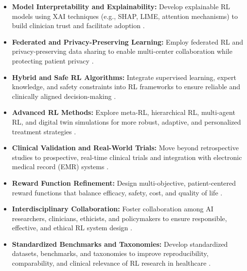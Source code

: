 \documentclass[runningheads]{llncs}
\begin{document}
\begin{itemize}
    \item \textbf{Model Interpretability and Explainability:} Develop explainable RL models using XAI techniques (e.g., SHAP, LIME, attention mechanisms) to build clinician trust and facilitate adoption \cite{banumathiReinforcementLearningPersonalized2025a, maDeepAttentionQnetwork2023, gorrepatiReinforcementLearningFramework2025, frommeyerReinforcementLearningIts2025}.
    \item \textbf{Federated and Privacy-Preserving Learning:} Employ federated RL and privacy-preserving data sharing to enable multi-center collaboration while protecting patient privacy \cite{banumathiReinforcementLearningPersonalized2025a, abdellatifReinforcementLearningIntelligent2021}.
    \item \textbf{Hybrid and Safe RL Algorithms:} Integrate supervised learning, expert knowledge, and safety constraints into RL frameworks to ensure reliable and clinically aligned decision-making \cite{wuValuebasedDeepReinforcement2023, yuSupervisedactorcriticReinforcementLearning2020, zhaoSafeenhancedFullyClosedloop2025, gorrepatiReinforcementLearningFramework2025}.
    \item \textbf{Advanced RL Methods:} Explore meta-RL, hierarchical RL, multi-agent RL, and digital twin simulations for more robust, adaptive, and personalized treatment strategies \cite{banumathiReinforcementLearningPersonalized2025a, decarloReinforcementLearningPKPD2024, gorrepatiReinforcementLearningFramework2025, petersenDeepReinforcementLearning2019}.
    \item \textbf{Clinical Validation and Real-World Trials:} Move beyond retrospective studies to prospective, real-time clinical trials and integration with electronic medical record (EMR) systems \cite{zhengPersonalizedMultimorbidityManagement2021, gorrepatiReinforcementLearningFramework2025, barataReinforcementLearningModel2023, ohEffectiveDatadrivenPrecision2022}.
    \item \textbf{Reward Function Refinement:} Design multi-objective, patient-centered reward functions that balance efficacy, safety, cost, and quality of life \cite{luoReinforcementLearningDynamic2024, petersenDeepReinforcementLearning2019, yangPrescDRLDeepReinforcement2024, zadehOptimizingWarfarinDosing2023}.
    \item \textbf{Interdisciplinary Collaboration:} Foster collaboration among AI researchers, clinicians, ethicists, and policymakers to ensure responsible, effective, and ethical RL system design \cite{banumathiReinforcementLearningPersonalized2025a, frommeyerReinforcementLearningIts2025}.
    \item \textbf{Standardized Benchmarks and Taxonomies:} Develop standardized datasets, benchmarks, and taxonomies to improve reproducibility, comparability, and clinical relevance of RL research in healthcare \cite{frommeyerReinforcementLearningIts2025, abdellatifReinforcementLearningIntelligent2021}.
\end{itemize}
\end{document}
